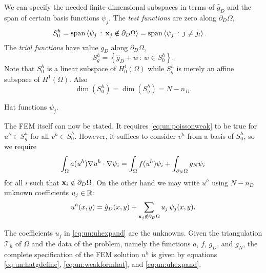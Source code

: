 We can specify the needed finite-dimensional subspaces in terms of $\hat g_D$ and the span of certain basis functions $\psi_j$.  The \emph{test functions} are zero along $\partial_D \Omega$,
\begin{align*}
S_{0}^h &= \operatorname{span}\left<\psi_j \,:\, \mathbf{x}_j \notin \partial_D \Omega\right> = \operatorname{span}\left<\psi_j \,:\, j \neq j_l\right>.
\end{align*}
The \emph{trial functions} have value $g_D$ along $\partial_D \Omega$,
\begin{equation}
S_{g}^h = \left\{\hat g_D + w \,:\, w \in S_{0}^h\right\}.
\end{equation}
Note that $S_{0}^h$ is a linear subspace of $H_{0}^1(\Omega)$ while $S_{g}^h$ is merely an affine subspace of $H^1(\Omega)$.  Also
\begin{equation}
\dim(S_{0}^h)=\dim(S_{g}^h)=N-n_D.
\end{equation}

\begin{marginfigure}

\caption{Hat functions $\psi_j$.}
\label{fig:un:hatfunction}
\end{marginfigure}

The FEM itself can now be stated.  It requires \eqref{eq:un:poissonweak} to be true for $u^h\in S_{g}^h$ for all $v^h\in S_{0}^h$.  However, it suffices to consider $v^h$ from a basis of $S_{0}^h$, so we require
\begin{equation}
\int_\Omega a(u^h) \nabla u^h \cdot \nabla \psi_i = \int_\Omega f(u^h) \psi_i + \int_{\partial_N\Omega} g_N \psi_i \label{eq:un:weakformhat}
\end{equation}
for all $i$ such that $\mathbf{x}_i \notin \partial_D \Omega$.  On the other hand we may write $u^h$ using $N-n_D$ unknown coefficients $u_j\in\mathbb{R}$:
\begin{equation}
u^h(x,y) = \hat g_D(x,y) + \sum_{\mathbf{x}_j \notin \partial_D \Omega} u_j\, \psi_j(x,y). \label{eq:un:uhexpand}
\end{equation}

The coefficients $u_j$ in \eqref{eq:un:uhexpand} are the unknowns.  Given the triangulation $\mathcal{T}_h$ of $\Omega$ and the data of the problem, namely the functions $a$, $f$, $g_D$, and $g_N$, the complete specification of the FEM solution $u^h$ is given by equations \eqref{eq:un:hatgdefine}, \eqref{eq:un:weakformhat}, and \eqref{eq:un:uhexpand}.


